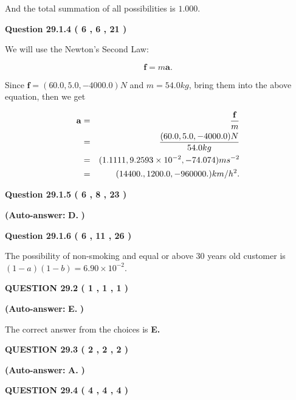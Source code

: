 \documentclass[12pt]{article}
\begin{document}
\noindent
 And the total summation of all possibilities is $  %
1.000 $.
 
  
  
{\textbf{\large{Question
29.1.4 
 (           6 ,           6 ,          21 )
}}}

We will use the Newton's Second Law:
 
\[
\mathbf{f}=m\mathbf{a}.
\]
 
Since $\mathbf{f}=( %
60.0,  %
5.0,  %
-4000.0 )N$
and $m= %
54.0 kg$, bring them into the above equation, then we get
 
\begin{eqnarray*}
\mathbf{a}&=&\frac{\mathbf{f}}m  \\
&=&\frac{(
60.0 ,
5.0 ,
-4000.0 )N
}{ %
54.0 kg}  \\
&=&(
1.1111 ,
9.2593 \times 10^{-2},
-74.074
)ms^{-2} \\
&=&(
14400. ,
1200.0 ,
-960000.
)km/h^2.
\end{eqnarray*}
 
  
  
{\textbf{\large{Question
29.1.5 
 (           6 ,           8 ,          23 )
}}}
 
 
{\textbf{(Auto-answer:}}
{\textbf{\large{
D.}}}
{\textbf{)}}
 
 
  
  
{\textbf{\large{Question
29.1.6 
 (           6 ,          11 ,          26 )
}}}

The possibility of  %
 non-smoking and  %
equal or above 30 years old
customer is $ (1-a)(1-b) =  %
6.90 \times 10^{-2} $.
  
  
{\textbf{\large{QUESTION
29.2 
 (           1 ,           1 ,           1 )
}}}
 
 
{\textbf{(Auto-answer:}}
{\textbf{\large{
E.}}}
{\textbf{)}}
 
 

The correct answer from the choices is
{\textbf{\large{
E.}}}
 
  
  
{\textbf{\large{QUESTION
29.3 
 (           2 ,           2 ,           2 )
}}}
 
 
{\textbf{(Auto-answer:}}
{\textbf{\large{
A.}}}
{\textbf{)}}
 
 
  
  
{\textbf{\large{QUESTION
29.4 
 (           4 ,           4 ,           4 )
}}}
 
 
\noindent{}
  
\end{document}
